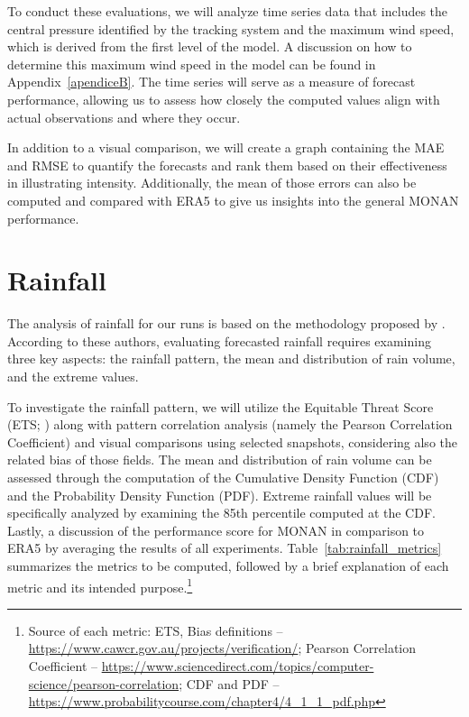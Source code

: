 To conduct these evaluations, we will analyze time series data that includes the central pressure identified by the tracking system and the maximum wind speed, which is derived from the first level of the model. A discussion on how to determine this maximum wind speed in the model can be found in Appendix~\ref{apendiceB}. The time series will serve as a measure of forecast performance, allowing us to assess how closely the computed values align with actual observations and where they occur.

In addition to a visual comparison, we will create a graph containing the MAE and RMSE to quantify the forecasts and rank them based on their effectiveness in illustrating intensity. Additionally, the mean of those errors can also be computed and compared with ERA5 to give us insights into the general MONAN performance. 


\section{Rainfall}
\label{section4.3}

The analysis of rainfall for our runs is based on the methodology proposed by . According to these authors, evaluating forecasted rainfall requires examining three key aspects: the rainfall pattern, the mean and distribution of rain volume, and the extreme values.

To investigate the rainfall pattern, we will utilize the Equitable Threat Score (ETS; \cite{mesinger2008bias}) along with pattern correlation analysis (namely the Pearson Correlation Coefficient) and visual comparisons using selected snapshots, considering also the related bias of those fields. The mean and distribution of rain volume can be assessed through the computation of the Cumulative Density Function (CDF) and the Probability Density Function (PDF). Extreme rainfall values will be specifically analyzed by examining the 85th percentile computed at the CDF. Lastly, a discussion of the performance score for MONAN in comparison to ERA5 by averaging the results of all experiments. Table~\ref{tab:rainfall_metrics} summarizes the metrics to be computed, followed by a brief explanation of each metric and its intended purpose.\footnote{Source of each metric: ETS, Bias definitions – \url{https://www.cawcr.gov.au/projects/verification/}; Pearson Correlation Coefficient – \url{https://www.sciencedirect.com/topics/computer-science/pearson-correlation}; CDF and PDF – \url{https://www.probabilitycourse.com/chapter4/4_1_1_pdf.php}}


